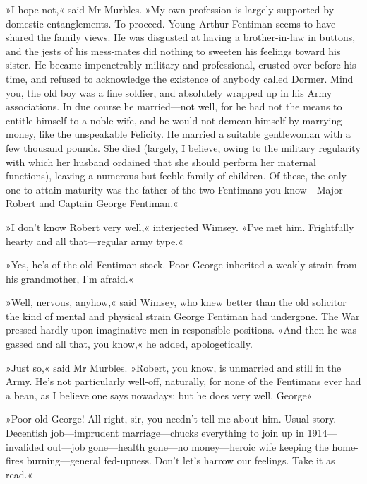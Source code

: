 »I hope not,« said Mr Murbles. »My own profession is largely supported by domestic entanglements. To proceed. Young Arthur Fentiman seems to have shared the family views. He was disgusted at having a brother-in-law in buttons, and the jests of his mess-mates did nothing to sweeten his feelings toward his sister. He became impenetrably military and professional, crusted over before his time, and refused to acknowledge the existence of anybody called Dormer. Mind you, the old boy was a fine soldier, and absolutely wrapped up in his Army associations. In due course he married\allowbreak---\allowbreak not well, for he had not the means to entitle himself to a noble wife, and he would not demean himself by marrying money, like the unspeakable Felicity. He married a suitable gentlewoman with a few thousand pounds. She died (largely, I believe, owing to the military regularity with which her husband ordained that she should perform her maternal functions), leaving a numerous but feeble family of children. Of these, the only one to attain maturity was the father of the two Fentimans you know\allowbreak---\allowbreak Major Robert and Captain George Fentiman.«

»I don't know Robert very well,« interjected Wimsey. »I've met him. Frightfully hearty and all that\allowbreak---\allowbreak regular army type.«

»Yes, he's of the old Fentiman stock. Poor George inherited a weakly strain from his grandmother, I'm afraid.«

»Well, nervous, anyhow,« said Wimsey, who knew better than the old solicitor the kind of mental and physical strain George Fentiman had undergone. The War pressed hardly upon imaginative men in responsible positions. »And then he was gassed and all that, you know,« he added, apologetically.

»Just so,« said Mr Murbles. »Robert, you know, is unmarried and still in the Army. He's not particularly well-off, naturally, for none of the Fentimans ever had a bean, as I believe one says nowadays; but he does very well. George\longdash«

»Poor old George! All right, sir, you needn't tell me about him. Usual story. Decentish job\allowbreak---\allowbreak imprudent marriage\allowbreak---\allowbreak chucks everything to join up in 1914\allowbreak---\allowbreak invalided out\allowbreak---\allowbreak job gone\allowbreak---\allowbreak health gone\allowbreak---\allowbreak no money\allowbreak---\allowbreak heroic wife keeping the home-fires burning\allowbreak---\allowbreak general fed-upness. Don't let's harrow our feelings. Take it as read.«

